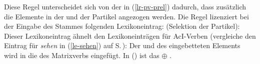 \noindent
Diese Regel unterscheidet sich von der in (\ref{lr-pv-prel}) dadurch, dass zusätzlich die Elemente
in der \subjl {} und \compsl {} der Partikel  angezogen werden. Die Regel lizenziert bei der Eingabe des Stammes  
folgenden Lexikoneintrag:
\eas
\label{le-lach-+particle}%
 (Selektion der Partikel):\\
\zs
Dieser Lexikoneintrag ähnelt den Lexikoneinträgen für AcI-Verben (vergleiche den Eintrag für
\emph{sehen} in (\ref{le-sehen}) auf S.\,\pageref{le-sehen}): Der \subjw und \compsw
des eingebetteten Elements wird in die
\argstl des Matrixverbs eingefügt. In () ist das  $\oplus$ . 

